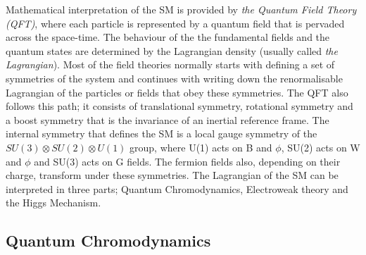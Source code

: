Mathematical interpretation of the SM is provided by \emph{the Quantum Field Theory (QFT)}, where each particle is represented by a quantum field that is pervaded across the space-time. The behaviour of the the fundamental fields and the quantum states are determined by the Lagrangian density (usually called \emph{the Lagrangian}). Most of the field theories normally starts with defining a set of symmetries of the system and continues with writing down the renormalisable Lagrangian of the particles or fields that obey these symmetries. The QFT also follows this path; it consists of translational symmetry, rotational symmetry and a boost symmetry that is the invariance of an inertial reference frame. The internal symmetry that defines the SM is a local gauge symmetry of the $ SU(3) \otimes SU(2) \otimes U(1)$ group, where U(1) acts on B and $\phi$, SU(2) acts on W and $\phi$ and SU(3) acts on G fields. The fermion fields also, depending on their charge, transform under these symmetries. The Lagrangian of the SM can be interpreted in three parts; Quantum Chromodynamics, Electroweak theory and the Higgs Mechanism.

\subsection{Quantum Chromodynamics}

